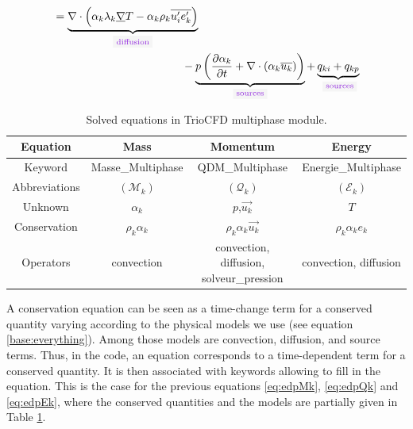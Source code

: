 \begin{align}
\begin{multlined}[c][0.8\linewidth]
                        =
                        \underbrace{\nabla \cdot \parent{\alpha_k\lambda_k \underline{\nabla} T - \alpha_k\rho_k \overline{u_i'e_k'}}}_{\text{{\colorbox{codebackground}{\color{codekeyword3} diffusion}}}}
                        \\ -\underbrace{p \parent{\frac{\partial \alpha_k}{\partial t} + \nabla \cdot (\alpha_k \overline{u_k})}}_{\text{{\colorbox{codebackground}{\color{codekeyword3} sources}}}} +
                        \underbrace{q_{ki} + q_{kp}}_{\text{ {\colorbox{codebackground}{\color{codekeyword3} sources}}}}
                      \end{multlined}\label{eq:edpEk}
\end{align}

\begin{table}[!ht]
\begin{center}
\renewcommand{\arraystretch}{2}
   \begin{tabular}{ c  c  c  c }
     \toprule
     Equation & Mass & Momentum & Energy \\
     \midrule
     Keyword  & {\colorbox{codebackground}{\color{codekeyword2} Masse_Multiphase}} & {\colorbox{codebackground}{\color{codekeyword2} QDM_Multiphase}} & {\colorbox{codebackground}{\color{codekeyword2} Energie_Multiphase}} \\
     Abbreviations & $(\mathcal{M}_k)$ & $(\mathcal{Q}_k)$  &  $(\mathcal{E}_k)$  \\
     Unknown & $\alpha_k$ & $p$,$\overrightarrow{u_k} $  & $T$\\
     Conservation & $\rho_k\alpha_k$ & $\rho_k\alpha_k \overrightarrow{u_k} $  & $\rho_k\alpha_k e_k$ \\
     Operators & {\colorbox{codebackground}{\color{codekeyword3} convection}} & \makecell{{\colorbox{codebackground}{\color{codekeyword3} convection}},{\colorbox{codebackground}{\color{codekeyword3} diffusion}},\\ {\colorbox{codebackground}{\color{codekeyword3} solveur_pression}}} & {\colorbox{codebackground}{\color{codekeyword3} convection}}, {\colorbox{codebackground}{\color{codekeyword3} diffusion}} \\
     \bottomrule
   \end{tabular}
 \end{center}
 \caption{Solved equations in TrioCFD multiphase module.}
\label{tab:schema}
\end{table}
 A conservation equation can be seen as a time-change term for a conserved quantity varying according to the physical models we use (see equation \ref{base:everything}). Among those models are convection, diffusion, and source terms. Thus, in the code, an equation corresponds to a time-dependent term for a conserved quantity. It is then associated with keywords allowing to fill in the equation. This is the case for the previous equations \ref{eq:edpMk}, \ref{eq:edpQk} and  \ref{eq:edpEk}, where the conserved quantities and the models are  partially given in Table \ref{tab:schema}.

